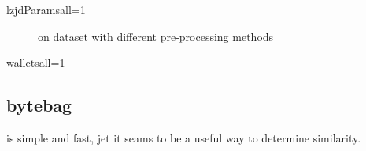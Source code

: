 \documentclass[../main.tex]{subfiles}
\begin{document}
\begin{sepTbl}{lzjdParams}{all}{=1}
  \caption{  and  on all codes from \n{\solcts}}
  \label{tbl:lz_solc_sep}
\end{sepTbl}

\begin{figure}[ht!]
  \centering
  \caption{ on  dataset with different pre-processing methods}
  \label{fig:hist_wallets_lzjd}
\end{figure}

\begin{sepTbl}{wallets}{all}{=1}
  \caption{  and  on all  codes}
  \label{tbl:lz_wall_sep}
\end{sepTbl}

\subsection{bytebag}
\begin{res}
   is simple and fast, jet it seams to be a useful way to determine similarity.
\end{res}
\end{document}
